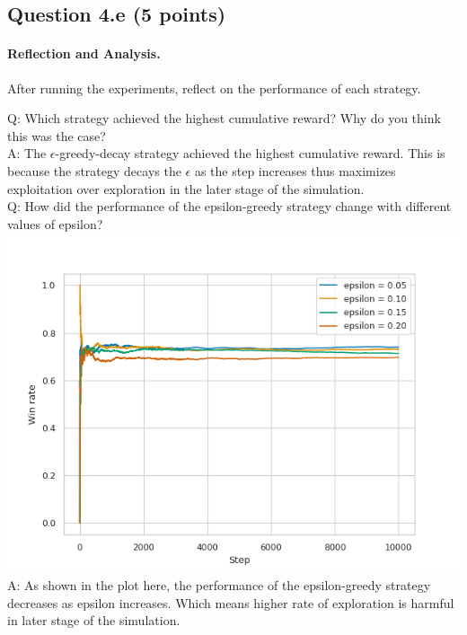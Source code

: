 \documentclass[12pt]{article}
\begin{document}
\subsection*{Question 4.e (5 points) } 
\paragraph{Reflection and Analysis.}
After running the experiments, reflect on the performance of each strategy.
\begin{solution}
Q: Which strategy achieved the highest cumulative reward? Why do you think this was the case?\\
A: The $\epsilon$-greedy-decay strategy achieved the highest cumulative reward. This is because the strategy decays the $\epsilon$ as the step increases thus maximizes exploitation over exploration in the later stage of the simulation. \\
Q: How did the performance of the epsilon-greedy strategy change with different values of epsilon?\\
\includegraphics[width = \textwidth]{hw/HW1/bandit_4d3.png}
A: As shown in the plot here, the performance of the epsilon-greedy strategy decreases as epsilon increases. Which means higher rate of exploration is harmful in later stage of the simulation.\\
\end{solution}
\end{document}
